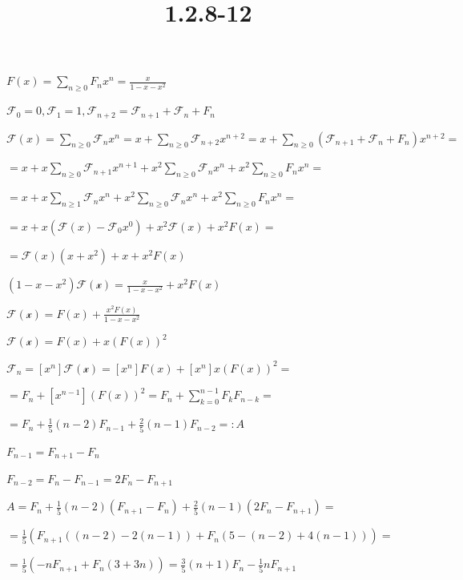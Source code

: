 \documentclass{article}
\title{1.2.8-12}
\begin{document}
\maketitle

\( F(x) = \sum_{n\geq 0}F_nx^n = \frac{x}{1-x-x^2} \)

\( \mathcal{F}_0 = 0, \mathcal{F}_1 = 1, \mathcal{F}_{n+2} = \mathcal{F}_{n+1} + \mathcal{F}_{n} + F_n \)

\( \mathcal{F}(x) = \sum_{n\geq 0} \mathcal{F}_n x^n = x + \sum_{n \geq 0} \mathcal{F}_{n+2}x^{n+2} = x + \sum_{n \geq 0} (\mathcal{F}_{n+1} + \mathcal{F}_{n} + F_n)x^{n+2} = \)

\( = x + x\sum_{n \geq 0}\mathcal{F}_{n+1}x^{n+1} + x^2\sum_{n \geq 0}\mathcal{F}_{n}x^{n} + x^2\sum_{n \geq 0}F_nx^n = \)

\( = x + x\sum_{n \geq 1}\mathcal{F}_{n}x^{n} + x^2\sum_{n \geq 0}\mathcal{F}_{n}x^{n} + x^2\sum_{n \geq 0}F_nx^n = \)

\( = x + x (\mathcal{F}(x) - \mathcal{F}_0x^0) + x^2\mathcal{F}(x)+x^2F(x) = \)

\( = \mathcal{F}(x)(x+x^2)+x+x^2F(x) \)

\( (1-x-x^2)\mathcal{F(x)} = \frac{x}{1-x-x^2} + x^2F(x) \)

\( \mathcal{F(x)} = F(x) + \frac{x^2F(x)}{1-x-x^2} \)

\( \mathcal{F(x)} = F(x) + x(F(x))^2 \)

\( \mathcal{F}_n = [x^n]\mathcal{F(x)} = [x^n]F(x) + [x^n]x(F(x))^2 = \)

\( = F_n + [x^{n-1}](F(x))^2 = F_n + \sum_{k=0}^{n-1}F_kF_{n-k} = \)

\( = F_n + \frac{1}{5}(n-2)F_{n-1} + \frac{2}{5}(n-1)F_{n-2} =: A \)

\( F_{n-1} = F_{n+1} - F_{n} \)

\( F_{n-2} = F_{n} - F_{n-1} = 2F_{n} - F_{n+1} \)

\( A = F_n + \frac{1}{5}(n-2)(F_{n+1} - F_{n}) + \frac{2}{5}(n-1)(2F_{n} - F_{n+1}) = \)

\( = \frac{1}{5}(F_{n+1}((n-2)-2(n-1)) + F_n(5-(n-2)+4(n-1))) = \)

\( = \frac{1}{5}(-nF_{n+1} + F_n(3+3n)) = \frac{3}{5}(n+1)F_n - \frac{1}{5}nF_{n+1} \)
\end{document}
